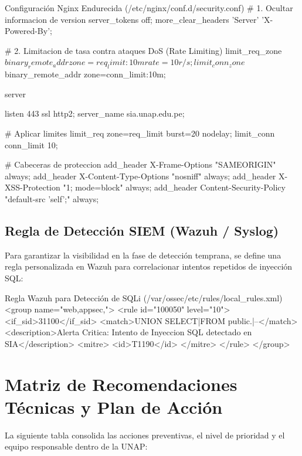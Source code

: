 \begin{cmdbox}{Configuración Nginx Endurecida (/etc/nginx/conf.d/security.conf)}
# 1. Ocultar informacion de version
server_tokens off;
more_clear_headers 'Server' 'X-Powered-By';

# 2. Limitacion de tasa contra ataques DoS (Rate Limiting)
limit_req_zone $binary_remote_addr zone=req_limit:10m rate=10r/s;
limit_conn_zone $binary_remote_addr zone=conn_limit:10m;

server {
    listen 443 ssl http2;
    server_name sia.unap.edu.pe;

    # Aplicar limites
    limit_req zone=req_limit burst=20 nodelay;
    limit_conn conn_limit 10;

    # Cabeceras de proteccion
    add_header X-Frame-Options "SAMEORIGIN" always;
    add_header X-Content-Type-Options "nosniff" always;
    add_header X-XSS-Protection "1; mode=block" always;
    add_header Content-Security-Policy "default-src 'self';" always;
}
\end{cmdbox}

\subsection{Regla de Detección SIEM (Wazuh / Syslog)}
Para garantizar la visibilidad en la fase de detección temprana, se define una regla personalizada en Wazuh para correlacionar intentos repetidos de inyección SQL:

\begin{cmdbox}{Regla Wazuh para Detección de SQLi (/var/ossec/etc/rules/local\_rules.xml)}
<group name="web,appsec,">
  <rule id="100050" level="10">
    <if_sid>31100</if_sid>
    <match>UNION SELECT|FROM public.|--</match>
    <description>Alerta Critica: Intento de Inyeccion SQL detectado en SIA</description>
    <mitre>
      <id>T1190</id>
    </mitre>
  </rule>
</group>
\end{cmdbox}

\section{Matriz de Recomendaciones Técnicas y Plan de Acción}
La siguiente tabla consolida las acciones preventivas, el nivel de prioridad y el equipo responsable dentro de la UNAP:

